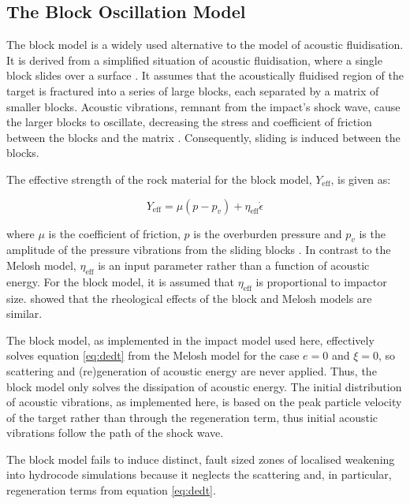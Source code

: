 \subsection{The Block Oscillation Model}

The block model is a widely used alternative to the \citet{melosh1979acoustic} model of acoustic fluidisation. It is derived from a simplified situation of acoustic fluidisation, where a single block slides over a surface \citep{ivanov1997block}. It assumes that the acoustically fluidised region of the target is fractured into a series of large blocks, each separated by a matrix of smaller blocks. Acoustic vibrations, remnant from the impact's shock wave, cause the larger blocks to oscillate, decreasing the stress and coefficient of friction between the blocks and the matrix \citep{collins2002numerical,ivanov1997block}. Consequently, sliding is induced between the blocks.

The effective strength of the rock material for the block model, $Y_{\text{eff}}$, is given as:

\begin{equation}
Y_{\text{eff}}=\mu (p-p_{v}) + \eta_{\text{eff}} \dot{\epsilon}
\end{equation}

where $\mu$ is the coefficient of friction, $p$ is the overburden pressure and $p_{v}$ is the amplitude of the pressure vibrations from the sliding blocks \citep{ivanov1997block,melosh1999impact}. In contrast to the Melosh model, $\eta_{\text{eff}}$ is an input parameter rather than a function of acoustic energy. For the block model, it is assumed that $\eta_{\text{eff}}$ is proportional to impactor size. \citet{melosh1999impact} showed that the rheological effects of the block and Melosh models are similar. 

The block model, as implemented in the impact model used here, effectively solves equation \ref{eq:dedt} from the Melosh model for the case $e=0$ and $\xi=0$, so scattering and (re)generation of acoustic energy are never applied. Thus, the block model only solves the dissipation of acoustic energy. The initial distribution of acoustic vibrations, as implemented here, is based on the peak particle velocity of the target rather than through the regeneration term, thus initial acoustic vibrations follow the path of the shock wave. 

The block model fails to induce distinct, fault sized zones of localised weakening into hydrocode simulations \citep{kenkmann2012modification} because it neglects the scattering and, in particular, regeneration terms from equation \ref{eq:dedt}.

